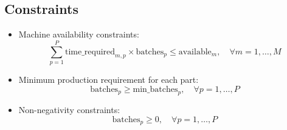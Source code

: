 \documentclass{article}
\begin{document}
\subsection*{Constraints}
\begin{itemize}
    \item Machine availability constraints:
    \[
    \sum_{p=1}^{P} \text{time\_required}_{m,p} \times \text{batches}_{p} \leq \text{available}_{m}, \quad \forall m = 1, \ldots, M
    \]
    \item Minimum production requirement for each part:
    \[
    \text{batches}_{p} \geq \text{min\_batches}_{p}, \quad \forall p = 1, \ldots, P
    \]
    \item Non-negativity constraints:
    \[
    \text{batches}_{p} \geq 0, \quad \forall p = 1, \ldots, P
    \]
\end{itemize}
\end{document}
